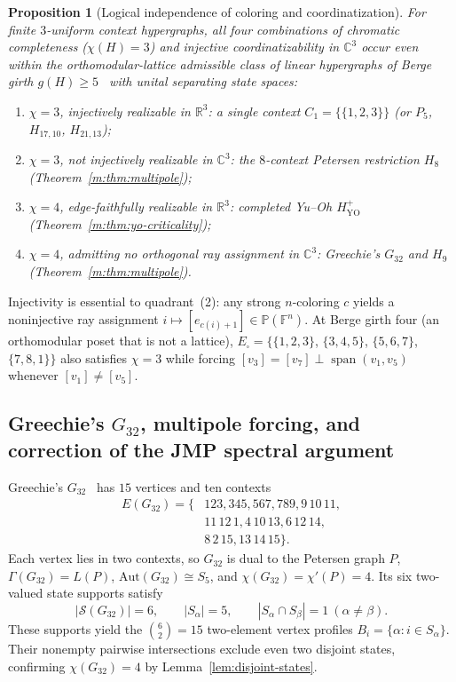 \documentclass[aps,pra,reprint,superscriptaddress,longbibliography,nofootinbib,floatfix,10pt]{revtex4-2}
\newtheorem{proposition}[theorem]{Proposition}
\theoremstyle{definition}\newtheorem{definition}[theorem]{Definition}
\theoremstyle{remark}\newtheorem{remark}[theorem]{Remark}
\newcommand{\C}{\mathbb C}\newcommand{\R}{\mathbb R}\newcommand{\Q}{\mathbb Q}
\newcommand{\F}{\mathbb F}\newcommand{\Z}{\mathbb Z}\newcommand{\PP}{\mathbb P}
\newcommand{\YO}{\mathrm{YO}}\newcommand{\ip}[2]{\langle #1,#2\rangle}
\DeclareMathOperator{\spanop}{span}\DeclareMathOperator{\rank}{rank}
\begin{document}
\begin{proposition}[Logical independence of coloring and coordinatization]\label{m:prop:independence}
For finite $3$-uniform context hypergraphs, all four combinations of chromatic completeness ($\chi(H)=3$) and injective coordinatizability in $\C^3$ occur even within the orthomodular-lattice admissible class of linear hypergraphs of Berge girth $g(H)\ge5$~\cite{greechie:71,svozil-tkadlec} with unital separating state spaces:
\begin{enumerate}
\item $\chi=3$, injectively realizable in $\R^3$: a single context $C_1=\{\{1,2,3\}\}$ (or $P_5$, $H_{17,10}$, $H_{21,13}$);
\item $\chi=3$, not injectively realizable in $\C^3$: the $8$-context Petersen restriction $H_8$ (Theorem~\ref{m:thm:multipole});
\item $\chi=4$, edge-faithfully realizable in $\R^3$: completed Yu--Oh $H_{\YO}^{+}$ (Theorem~\ref{m:thm:yo-criticality});
\item $\chi=4$, admitting no orthogonal ray assignment in $\C^3$: Greechie's $G_{32}$ and $H_9$ (Theorem~\ref{m:thm:multipole}).
\end{enumerate}
\end{proposition}
Injectivity is essential to quadrant~(2): any strong $n$-coloring $c$ yields a noninjective ray assignment $i\mapsto[e_{c(i)+1}]\in\PP(\F^n)$. At Berge girth four (an orthomodular poset that is not a lattice), $E_\square=\{\{1,2,3\}$, $\{3,4,5\}$, $\{5,6,7\}$, $\{7,8,1\}\}$ also satisfies $\chi=3$ while forcing $[v_3]=[v_7]\perp\spanop(v_1,v_5)$ whenever $[v_1]\ne[v_5]$.

\subsection{Greechie's \texorpdfstring{$G_{32}$}{G32}, multipole forcing, and correction of the JMP spectral argument}\label{m:sec:g32}

Greechie's $G_{32}$~\cite[Fig.~6]{greechie:71} has $15$ vertices and ten contexts
\begin{equation}\label{m:eq:g32-blocks}
\begin{aligned}
E(G_{32})=\{&123,345,567,789,9\,10\,11,\\
&11\,12\,1,4\,10\,13,6\,12\,14,\\
&8\,2\,15,13\,14\,15\}.
\end{aligned}
\end{equation}
Each vertex lies in two contexts, so $G_{32}$ is dual to the Petersen graph $P$, $\Gamma(G_{32})=L(P)$, $\mathrm{Aut}(G_{32})\cong S_5$, and $\chi(G_{32})=\chi'(P)=4$. Its six two-valued state supports satisfy
\begin{equation}\label{m:eq:g32-states}
|\mathcal S(G_{32})|=6,\qquad |S_\alpha|=5,\qquad
|S_\alpha\cap S_\beta|=1\ (\alpha\ne\beta).
\end{equation}
These supports yield the $\binom{6}{2}=15$ two-element vertex profiles $B_i=\{\alpha:i\in S_\alpha\}$. Their nonempty pairwise intersections exclude even two disjoint states, confirming $\chi(G_{32})=4$ by Lemma~\ref{lem:disjoint-states}.
\end{document}
